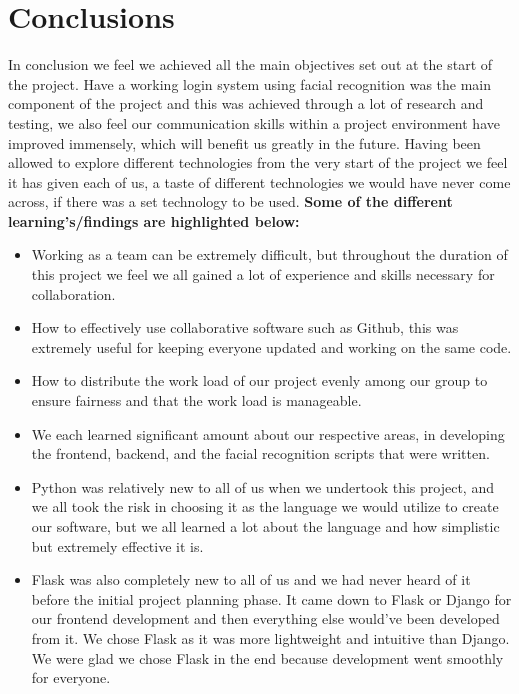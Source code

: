 \documentclass{article}
\begin{document}
\section{Conclusions}
In conclusion we feel we achieved all the main objectives set out at the start of the project. Have a working login system using facial recognition was the main component of the project and this was achieved through a lot of research and testing, we also feel our communication skills within a project environment have improved immensely, which will benefit us greatly in the future. 
Having been allowed to explore different technologies from the very start of the project we feel it has given each of us, a taste of different technologies we would have never come across, if there was a set technology to be used. \textbf{Some of the different learning's/findings are highlighted below:}
\\
\begin{itemize}
    \item Working as a team can be extremely difficult, but throughout the duration of this project we feel we all gained a lot of experience and skills necessary for collaboration.
    \item How to effectively use collaborative software such as Github, this was extremely useful for keeping everyone updated and working on the same code.
    \item  How to distribute the work load of our project evenly among our group to ensure fairness and that the work load is manageable.
    \item We each learned significant amount about our respective areas, in developing the frontend, backend, and the facial recognition scripts that were written.
    \item Python was relatively new to all of us when we undertook this project, and we all took the risk in choosing it as the language we would utilize to create our software, but we all learned a lot about the language and how simplistic but extremely effective it is.
    \item Flask was also completely new to all of us and we had never heard of it before the initial project planning phase. It came down to Flask or Django for our frontend development and then everything else would've been developed from it. We chose Flask as it was more lightweight and intuitive than Django. We were glad we chose Flask in the end because development went smoothly for everyone.
\end{itemize}

\newpage
\printbibliography
\end{document}
